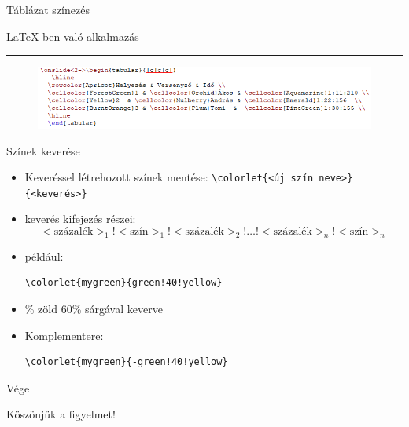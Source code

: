 \documentclass[aspectratio=1610, dvipsnames, xcolor=table]{beamer}
\begin{document}
    \begin{frame}[fragile]{Táblázat színezés}
    \begin{center}
        \LaTeX-ben való alkalmazás
        \noindent
        {\color{Dandelion} \rule{\linewidth}{1mm}}
    \end{center}
        \begin{figure}[H]
            \includegraphics[scale=0.8]{img/tablealkalmazas.png}        
        \end{figure}
    \end{frame}

    


    \begin{frame}[fragile]{Színek keverése}
        \begin{itemize}
            \item {}Keveréssel létrehozott színek mentése: \verb!\colorlet{<új szín neve>}{<keverés>}!
            \item {}keverés kifejezés részei: $$<\text{százalék}>_1!<\text{szín}>_1!<\text{százalék}>_2!\ldots!<\text{százalék}>_n!<\text{szín}>_n$$
            \item {}például: \begin{verbatim}\colorlet{mygreen}{green!40!yellow}\end{verbatim} 
            \item {}\% zöld 60\% sárgával keverve  
            \item {}Komplementere:  \begin{verbatim}\colorlet{mygreen}{-green!40!yellow}\end{verbatim} 
            


        \end{itemize}
    \end{frame}
    \begin{frame}{Vége}
        
        \centering \Huge Köszönjük a figyelmet!
        
    \end{frame}
\end{document}
